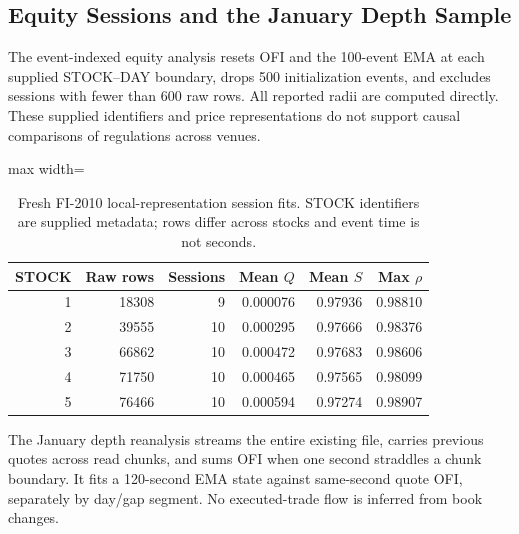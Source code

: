 \documentclass[12pt]{article}
\theoremstyle{definition}
\theoremstyle{remark}
\begin{document}
\subsection{Equity Sessions and the January Depth Sample}
The event-indexed equity analysis resets OFI and the 100-event EMA at each supplied STOCK--DAY boundary, drops 500 initialization events, and excludes sessions with fewer than 600 raw rows. All reported radii are computed directly. These supplied identifiers and price representations do not support causal comparisons of regulations across venues.

\begin{table}[htbp]
\centering\small
\caption{Fresh FI-2010 local-representation session fits. STOCK identifiers are supplied metadata; rows differ across stocks and event time is not seconds.}
\label{tab:equity_revised}
\begin{adjustbox}{max width=\textwidth}
\begin{tabular}{rrrrrr}\toprule
STOCK & Raw rows & Sessions & Mean $Q$ & Mean $S$ & Max $\rho$ \\\midrule
1 & 18308 & 9 & 0.000076 & 0.97936 & 0.98810 \\
2 & 39555 & 10 & 0.000295 & 0.97666 & 0.98376 \\
3 & 66862 & 10 & 0.000472 & 0.97683 & 0.98606 \\
4 & 71750 & 10 & 0.000465 & 0.97565 & 0.98099 \\
5 & 76466 & 10 & 0.000594 & 0.97274 & 0.98907 \\
\bottomrule\end{tabular}
\end{adjustbox}
\end{table}

The January depth reanalysis streams the entire existing file, carries previous quotes across read chunks, and sums OFI when one second straddles a chunk boundary. It fits a 120-second EMA state against same-second quote OFI, separately by day/gap segment. No executed-trade flow is inferred from book changes.
\end{document}
